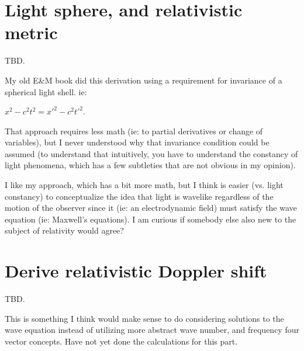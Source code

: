 \section{Light sphere, and relativistic metric}

TBD.

My old E\&M book did this derivation using a requirement for invariance of a spherical light shell.  ie:

\(x^2 - c^2 t^2 = {x'}^2 - c^2 {t'}^2\).

That approach requires less math (ie: to partial derivatives or change of variables), but I never understood why that invariance condition could be assumed (to understand that intuitively, you have to understand the constancy of light phenomena, which has a few subtleties that are not obvious in my opinion).

I like my approach, which has a bit more math, but I think is easier (vs. light constancy) to conceptualize the idea that light is wavelike regardless of the motion of the observer since it (ie: an electrodynamic field) must satisfy the wave equation (ie: Maxwell's equations).  I am curious if somebody else also new to the subject of relativity would agree?

\section{Derive relativistic Doppler shift}

TBD.

This is something I think would make sense to do considering solutions
to the wave
equation instead of utilizing more abstract wave number, and frequency
four vector concepts.  Have not yet done the calculations for this part.
